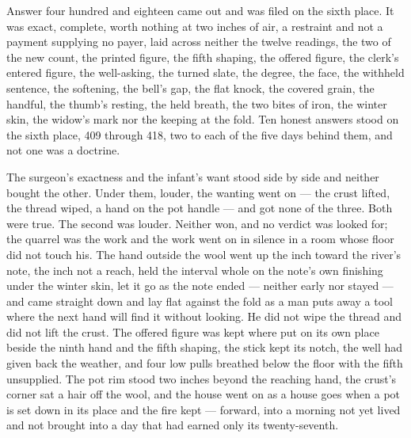 Answer four hundred and eighteen came out and was filed on the sixth place. It was exact, complete, worth nothing at two inches of air, a restraint and not a payment supplying no payer, laid across neither the twelve readings, the two of the new count, the printed figure, the fifth shaping, the offered figure, the clerk's entered figure, the well-asking, the turned slate, the degree, the face, the withheld sentence, the softening, the bell's gap, the flat knock, the covered grain, the handful, the thumb's resting, the held breath, the two bites of iron, the winter skin, the widow's mark nor the keeping at the fold. Ten honest answers stood on the sixth place, 409 through 418, two to each of the five days behind them, and not one was a doctrine.

The surgeon's exactness and the infant's want stood side by side and neither bought the other. Under them, louder, the wanting went on --- the crust lifted, the thread wiped, a hand on the pot handle --- and got none of the three. Both were true. The second was louder. Neither won, and no verdict was looked for; the quarrel was the work and the work went on in silence in a room whose floor did not touch his. The hand outside the wool went up the inch toward the river's note, the inch not a reach, held the interval whole on the note's own finishing under the winter skin, let it go as the note ended --- neither early nor stayed --- and came straight down and lay flat against the fold as a man puts away a tool where the next hand will find it without looking. He did not wipe the thread and did not lift the crust. The offered figure was kept where put on its own place beside the ninth hand and the fifth shaping, the stick kept its notch, the well had given back the weather, and four low pulls breathed below the floor with the fifth unsupplied. The pot rim stood two inches beyond the reaching hand, the crust's corner sat a hair off the wool, and the house went on as a house goes when a pot is set down in its place and the fire kept --- forward, into a morning not yet lived and not brought into a day that had earned only its twenty-seventh.
